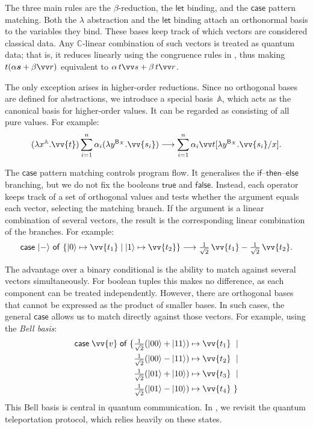 \documentclass[runningheads,orivec,envcountsame,envcountsect]{llncs}
\newcommand\ket[1]{\ensuremath{|#1\rangle}}
\newcommand\lra{\longrightarrow}
\newcommand\AbsBasis{\ensuremath{\mathbb{A}}}
\def\C{\mathbb{C}}            %
\def\Lam#1#2#3{\lambda#1^{#2}{.}#3} %
\def\case#1#2#3#4#5{\ensuremath{\mathsf{case}~#1~\mathsf{of}~\{#2\mapsto #4 \mid #3\mapsto #5\}}}
\newcommand\basis[1]{\ensuremath{\mathsf{B}_{#1}}}
\begin{document}
The three main rules are the $\beta$-reduction, the $\mathsf{let}$ binding, and
the $\mathsf{case}$ pattern matching. Both the $\lambda$ abstraction and the
$\mathsf{let}$ binding attach an orthonormal basis to the variables they bind.
These bases keep track of which vectors are considered classical data.  Any
$\C$-linear combination of such vectors is treated as quantum data; that is, it
reduces linearly using the congruence rules in
, thus making $t(\alpha\vec
s+\beta\vv r)$ equivalent to $\alpha\,t\vv s+\beta\,t\vv r$.

The only exception arises in higher-order reductions. Since no orthogonal bases
are defined for abstractions, we introduce a special basis~$\AbsBasis$, which
acts as the canonical basis for higher-order values. It can be regarded as consisting
of all pure values. For example:
\[
  (\Lam{x}{\AbsBasis}{\vv{t}})
  \sum_{i=1}^{n}\alpha_i(\Lam{y}{\basis{X}}{\vv{s_i}})
  \lra
  \sum_{i=1}^n\alpha_i\vv t[\Lam{y}{\basis{X}}{\vv{s_i}}/x].
\]

The $\mathsf{case}$ pattern matching controls program flow. It generalises the
$\mathsf{if}$--$\mathsf{then}$--$\mathsf{else}$ branching, but we do not fix
the booleans $\mathsf{true}$ and $\mathsf{false}$. Instead, each operator keeps
track of a set of orthogonal values and tests whether the argument equals each
vector, selecting the matching branch. If the argument is a linear combination
of several vectors, the result is the corresponding linear combination of the
branches. For example:
\[
  \case{\ket{-}}{\ket{0}}{\ket{1}}{\vv{t_1}}{\vv{t_2}} \lra
  \tfrac{1}{\sqrt{2}}\,\vv{t_1} - \tfrac{1}{\sqrt{2}}\,\vv{t_2}.
\]

The advantage over a binary conditional is the ability to match against several
vectors simultaneously. For boolean tuples this makes no difference, as each
component can be treated independently. However, there are orthogonal bases
that cannot be expressed as the product of smaller bases. In such cases, the
general $\mathsf{case}$ allows us to match directly against those vectors. For
example, using the \emph{Bell basis}:
\begin{align*}
  \mathsf{case}\;\vv{v}\;\mathsf{of}\;\{&
  \tfrac{1}{\sqrt{2}}(\ket{00}+\ket{11}) \mapsto \vv{t_1}\ \mid\\
  &\tfrac{1}{\sqrt{2}}(\ket{00}-\ket{11}) \mapsto \vv{t_2}\ \mid\\
  &\tfrac{1}{\sqrt{2}}(\ket{01}+\ket{10}) \mapsto \vv{t_3}\ \mid\\
  &\tfrac{1}{\sqrt{2}}(\ket{01}-\ket{10}) \mapsto \vv{t_4}\ \}
\end{align*}
This Bell basis is central in quantum communication. In
, we revisit the quantum teleportation protocol,
which relies heavily on these states.
\end{document}
